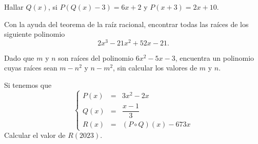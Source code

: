 \begin{section-problem}
    Hallar $Q(x)$, si $P\left(Q(x) - 3\right) = 6x + 2$ y $P(x + 3) = 2x + 10$.
\end{section-problem}

\begin{section-problem}
    Con la ayuda del teorema de la raíz racional, encontrar todas las raíces de los siguiente polinomio
    \[2 x^3 - 21 x^2 + 52 x - 21.\]
\end{section-problem}

\begin{section-problem}
    Dado que $m$ y $n$ son raíces del polinomio $6x^2 - 5x - 3$, encuentra un polinomio cuyas raíces sean
    $m - n^2$ y $n - m^2$, sin calcular los valores de $m$ y $n$.
\end{section-problem}

\begin{section-problem}
    Si tenemos que
    \[
        \left\{
        \begin{array}{rcl}
            P(x) & =& 3x^2 - 2x \\
            Q(x) & =& \dfrac{x - 1}{3} \\
            R(x) & =& (P \circ Q)(x) - 673x
        \end{array}
        \right.
    \]
    Calcular el valor de $R(2023)$.
\end{section-problem}